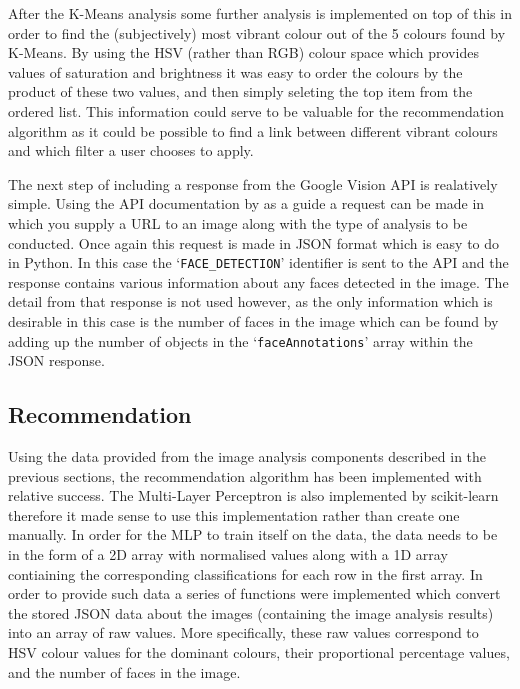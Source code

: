 \documentclass[a4paper,12pt]{report}
\begin{document}

      After the K-Means analysis some further analysis is implemented on top of this in order to find the (subjectively) most vibrant colour out of the 5 colours found by K-Means. By using the HSV (rather than RGB) colour space which provides values of saturation and brightness it was easy to order the colours by the product of these two values, and then simply seleting the top item from the ordered list. This information could serve to be valuable for the recommendation algorithm as it could be possible to find a link between different vibrant colours and which filter a user chooses to apply.

      The next step of including a response from the Google Vision API is realatively simple. Using the API documentation by \cite{vision2018apidoc} as a guide a request can be made in which you supply a URL to an image along with the type of analysis to be conducted. Once again this request is made in JSON format which is easy to do in Python. In this case the ‘\texttt{FACE\_DETECTION}’ identifier is sent to the API and the response contains various information about any faces detected in the image. The detail from that response is not used however, as the only information which is desirable in this case is the number of faces in the image which can be found by adding up the number of objects in the ‘\texttt{faceAnnotations}’ array within the JSON response.

    \subsection{Recommendation}
      Using the data provided from the image analysis components described in the previous sections, the recommendation algorithm has been implemented with relative success. The Multi-Layer Perceptron is also implemented by scikit-learn therefore it made sense to use this implementation rather than create one manually. In order for the MLP to train itself on the data, the data needs to be in the form of a 2D array with normalised values along with a 1D array contiaining the corresponding classifications for each row in the first array. In order to provide such data a series of functions were implemented which convert the stored JSON data about the images (containing the image analysis results) into an array of raw values. More specifically, these raw values correspond to HSV colour values for the dominant colours, their proportional percentage values, and the number of faces in the image.
\end{document}
